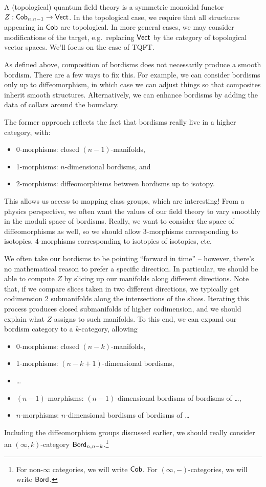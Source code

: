 A (topological) quantum field theory is a symmetric monoidal functor $Z: \mathsf{Cob}_{n,n-1} \to \mathsf{Vect}$.
In the topological case, we require that all structures appearing in $\mathsf{Cob}$ are topological.
In more general cases, we may consider modifications of the target, e.g.\ replacing $\mathsf{Vect}$ by the category of topological vector spaces.
We'll focus on the case of TQFT.

As defined above, composition of bordisms does not necessarily produce a smooth bordism.
There are a few ways to fix this.
For example, we can consider bordisms only up to diffeomorphism, in which case we can adjust things so that composites inherit smooth structures.
Alternatively, we can enhance bordisms by adding the data of collars around the boundary.

The former approach reflects the fact that bordisms really live in a higher category, with:
\begin{itemize}
	\item 0-morphisms: closed $(n-1)$-manifolds,
	\item 1-morphisms: $n$-dimensional bordisms, and
	\item 2-morphisms: diffeomorphisms between bordisms up to isotopy.
\end{itemize}
This allows us access to mapping class groups, which are interesting!
From a physics perspective, we often want the values of our field theory to vary smoothly in the moduli space of bordisms.
Really, we want to consider the space of diffeomorphisms as well, so we should allow 3-morphisms corresponding to isotopies, 4-morphisms corresponding to isotopies of isotopies, etc.

We often take our bordisms to be pointing ``forward in time'' -- however, there's no mathematical reason to prefer a specific direction.
In particular, we should be able to compute $Z$ by slicing up our manifolds along different directions.
Note that, if we compare slices taken in two different directions, we typically get codimension 2 submanifolds along the intersections of the slices.
Iterating this process produces closed submanifolds of higher codimension, and we should explain what $Z$ assigns to such manifolds.
To this end, we can expand our bordism category to a $k$-category, allowing
\begin{itemize}
	\item 0-morphisms: closed $(n-k)$-manifolds,
	\item 1-morphisms: $(n-k+1)$-dimensional bordisms,
	\item \dots
	\item $(n - 1)$-morphisms: $(n-1)$-dimensional bordisms of bordisms of \dots,
	\item $n$-morphisms: $n$-dimensional bordisms of bordisms of \dots
\end{itemize}
Including the diffeomorphism groups discussed earlier, we should really consider an $(\infty, k)$-category $\mathsf{Bord}_{n,n-k}$.\footnote{For non-$\infty$ categories, we will write $\mathsf{Cob}$.
For $(\infty, -)$-categories, we will write $\mathsf{Bord}$.}

